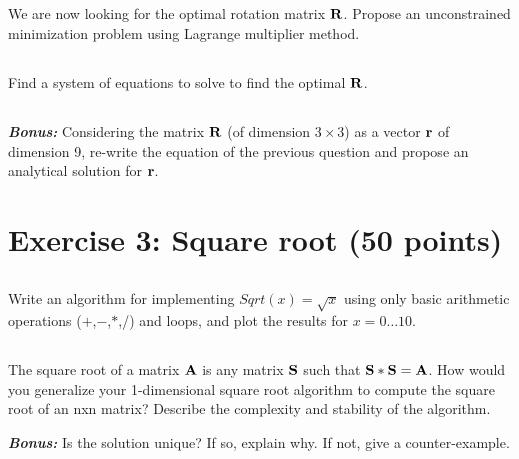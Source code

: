 \subsection{} We are now looking for the optimal rotation matrix ${\bf R}$. Propose an unconstrained minimization problem using Lagrange multiplier method. 
\subsection{} Find a system of equations to solve to find the optimal ${\bf R}$.

\subsection{} \emph{\textbf{Bonus:}} Considering the  matrix ${\bf R}$ (of dimension $3 \times 3$) as a vector ${\bf r}$ of dimension 9, re-write the equation of the previous question and propose an analytical solution for ${\bf r}$.

\section*{Exercise 3: Square root \normalsize \textnormal(50 points)}

\subsection{} Write an algorithm for implementing $Sqrt(x) = \sqrt{x}$ using only basic arithmetic operations ($+$,$-$,$*$,/) and loops, and plot the results for $x=0 \hdots 10$.
\subsection{} The square root of a matrix ${\bf A}$ is any matrix ${\bf S}$ such that ${\bf S}*{\bf S}={\bf A}$. How would you generalize your 1-dimensional square root algorithm to compute the square root of an nxn matrix? Describe the complexity and stability of the algorithm.

\emph{\textbf{Bonus:}} Is the solution unique? If so, explain why. If not, give a counter-example.

